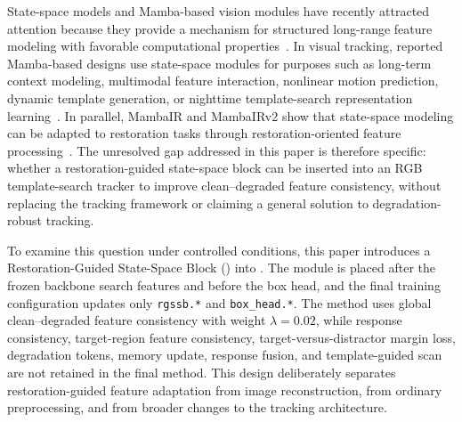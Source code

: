State-space models and Mamba-based vision modules have recently attracted attention because they provide a mechanism for structured long-range feature modeling with favorable computational properties~\cite{gu2024mamba,zhu2024visionmamba,liu2024vmamba}. In visual tracking, reported Mamba-based designs use state-space modules for purposes such as long-term context modeling, multimodal feature interaction, nonlinear motion prediction, dynamic template generation, or nighttime template-search representation learning~\cite{li2024mambalct,huang2024mambafetrack,xiao2024mambatrack,wang2024mambaevt,wu2024mambanut}. In parallel, MambaIR and MambaIRv2 show that state-space modeling can be adapted to restoration tasks through restoration-oriented feature processing~\cite{guo2024mambair,guo2025mambairv2}. The unresolved gap addressed in this paper is therefore specific: whether a restoration-guided state-space block can be inserted into an RGB template-search tracker to improve clean--degraded feature consistency, without replacing the tracking framework or claiming a general solution to degradation-robust tracking.

To examine this question under controlled conditions, this paper introduces a Restoration-Guided State-Space Block (\method{}) into \baseline{}. The module is placed after the frozen backbone search features and before the box head, and the final training configuration updates only \texttt{rgssb.*} and \texttt{box\_head.*}. The method uses global clean--degraded feature consistency with weight $\lambda=0.02$, while response consistency, target-region feature consistency, target-versus-distractor margin loss, degradation tokens, memory update, response fusion, and template-guided scan are not retained in the final method. This design deliberately separates restoration-guided feature adaptation from image reconstruction, from ordinary preprocessing, and from broader changes to the tracking architecture.

